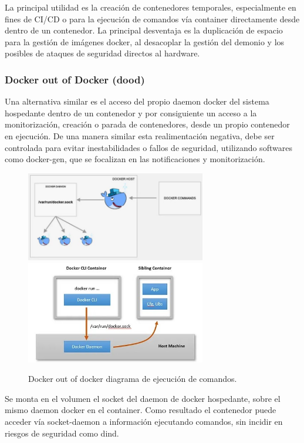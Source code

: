 La principal utilidad es la creación de contenedores temporales, especialmente en fines de CI/CD o para la ejecución de comandos vía container directamente desde dentro de un contenedor. La principal desventaja es la duplicación de espacio para la gestión de imágenes docker, al desacoplar la gestión del demonio y los posibles de ataques de seguridad directos al hardware.

\subsubsection{Docker out of Docker (dood)}
Una alternativa similar es el acceso del propio daemon docker del sistema hospedante dentro de un contenedor\cite{c_dood} y por consiguiente un acceso a la monitorización, creación o parada de contenedores, desde un propio contenedor en ejecución. De una manera similar esta realimentación negativa, debe ser controlada para evitar inestabilidades o fallos de seguridad, utilizando softwares como docker-gen\cite{c_docker_gen}, que se focalizan en las notificaciones y monitorización.
\begin{figure}[!htb]
\begin{center}
\includegraphics[width=0.7\textwidth]{./figuras/dood.jpg}
\includegraphics[width=0.7\textwidth]{./figuras/dood_command.jpg}
\caption{Docker out of docker diagrama de ejecución de comandos\cite{i_dind_dood}.}
\label{F:dood}
\end{center}
\end{figure}
Se monta en el volumen el socket del daemon de docker hospedante, sobre el mismo daemon docker en el container. Como resultado el contenedor puede acceder vía socket-daemon a información ejecutando comandos, sin incidir en riesgos de seguridad como dind.


